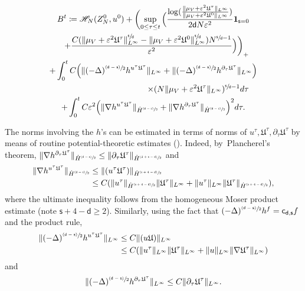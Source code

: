 \documentclass[JEP,XML,SOM,Unicode,published]{cedram}
\newcommand{\psfrac}[2]{\sfrac{(#1)}{#2}}
\theoremstyle{plain}
\theoremstyle{definition}
\DeclarePairedDelimiter{\pa}{\lparen}{\rparen}
\let\div\relax
\DeclareMathOperator{\div}{\mathrm{div}}
\let\vep\varepsilon
\let\nab\nabla
\let\p\partial
\let\uz Z
\newcommand{\indic}{\mathbf{1}}
\newcommand{\Uu}{\mathfrak{U}}
\renewcommand{\d}{\mathsf{d}}
\newcommand{\s}{\mathsf{s}}
\newcommand{\cd}{\mathsf{c}_{\mathsf{d},\mathsf{s}}}
\begin{document}
\begin{multline*}
B^t \coloneqq {\mathscr{H}_{N}(\uz_N^0,u^0)} + \biggl(\sup_{0\le\tau\le t}\Big(\frac{\log(\frac{\|\mu_V+\vep^2\Uu^\tau\|_{L^\infty}}{\|\mu_V+\vep^2\Uu^0\|_{L^\infty}})}{2\d N\vep^2}\indic_{\s=0} \\
\shoveright{+ \frac{C(\|\mu_V+\vep^2\Uu^\tau\|_{L^\infty}^{\sfrac{\s}{\d}} -\|\mu_V+\vep^2\Uu^0\|_{L^\infty}^{\sfrac{\s}{\d}}) N^{\sfrac{\s}{\d}-1}}{\vep^2}\Big)\biggr)_+} \\
+ \int_0^t C\pa*{\|(-\Delta)^{\psfrac{\d-\s}{2}}\div h^{u^\tau\Uu^\tau}\|_{L^\infty}+\|(-\Delta)^{\psfrac{\d-\s}{2}}h^{\p_\tau\Uu^\tau}\|_{L^\infty}}\\
\shoveright{\times(N\|{\mu_V+\vep^2\Uu^\tau}\|_{L^\infty})^{\sfrac{\s}{\d}-1}d\tau} \\
+\int_0^t C\vep^2\pa*{\|\nabla\div h^{u^\tau\Uu^\tau}\|_{\dot{H}^{\psfrac{\d-\s}{2}}} + \|\nabla h^{\p_\tau\Uu^\tau}\|_{\dot{H}^{\psfrac{\d-\s}{2}}}}^{ 2}d\tau.
\end{multline*}

The norms involving the $h$'s can be estimated in terms of norms of $u^\tau,\Uu^\tau,\p_\tau\Uu^\tau$ by means of routine potential-theoretic estimates (\cf \cite[Lem.\,4.3-4.4]{Rosenzweig2021ne}). Indeed, by~Plancherel's theorem, $\|\nabla h^{\p_\tau\Uu^\tau}\|_{\dot{H}^{\psfrac{\d-\s}{2}}} \leq \|\p_\tau\Uu^\tau\|_{\dot{H}^{\psfrac{2+\s-\d}{2}}}$ and
\begin{align*}
\|\nabla\div h^{u^\tau \Uu^\tau}\|_{\dot{H}^{\psfrac{\d-\s}{2}}} &\leq \|(u^\tau\Uu^\tau)\|_{\dot{H}^{\psfrac{\s+4-\d}{2}}}\\
&\leq C\pa*{\|u^\tau\|_{\dot{H}^{\psfrac{\s+4-\d}{2}}}\|\Uu^\tau\|_{L^\infty} + \|u^\tau\|_{L^\infty}\|\Uu^\tau\|_{\dot{H}^{\psfrac{\s+4-\d}{2}}}},
\end{align*}
where the ultimate inequality follows from the homogeneous Moser product estimate \cite[Cor.\,2.54]{BCD2011} (note $\s+4-\d\ge 2$). Similarly, using the fact that $(-\Delta)^{\psfrac{\d-\s}{2}}h^f = \cd f$ and the product rule,
\begin{align*}
\|(-\Delta)^{\psfrac{\d-\s}{2}}\div h^{u^\tau\Uu^\tau}\|_{L^\infty} &\le C\|\div(u\Uu)\|_{L^\infty}\\
&\le C(\|\div u^\tau\|_{L^\infty}\|\Uu^\tau\|_{L^\infty} + \|u\|_{L^\infty}\|\nab \Uu^\tau\|_{L^\infty})
\end{align*}
and
\begin{align*}
\|(-\Delta)^{\psfrac{\d-\s}{2}}h^{\p_\tau\Uu^\tau}\|_{L^\infty} \le C\|\p_\tau\Uu^\tau\|_{L^\infty}.
\end{align*}
\end{document}
